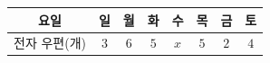 {\renewcommand{\arraystretch}{1.35}\small
\begin{tabular}{|c|c|c|c|c|c|c|c|}
\hline
요일 & 일 & 월 & 화 & 수 & 목 & 금 & 토 \\ \hline
전자 우편(개) & $3$ & $6$ & $5$ & $x$ & $5$ & $2$ & $4$ \\ \hline
\end{tabular}}
